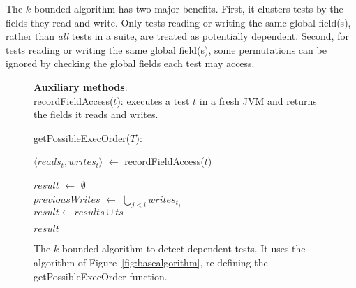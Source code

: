 The \dependenceaware{} $k$-bounded algorithm has two major benefits.
First, it clusters tests by the fields they
read and write. Only tests reading or writing
the same global field(s), rather than \textit{all} tests
in a suite, are treated as potentially dependent.
Second, for tests reading or writing the same global
field(s), some permutations can be ignored by checking
the global fields each test may access. 

\begin{figure}[t]
\textbf{Auxiliary methods}:\\
recordFieldAccess($\mathit{t}$): executes a test $\mathit{t}$ in
a fresh JVM and returns the fields it reads and writes.\\


\vspace{-2mm}

getPossibleExecOrder($T$):\\
\vspace{-5mm}
\begin{algorithmic}[1]
\STATE $\langle \mathit{reads}_t, \mathit{writes}_t\rangle$ $\leftarrow$ recordFieldAccess($\mathit{t}$)\\ 
\ENDFOR

\STATE $\mathit{result}$ $\leftarrow$ $\emptyset$ \\
		\STATE $\mathit{previousWrites}$ $\leftarrow$ $\bigcup_{\mathit{j} < \mathit{i}}  \mathit{writes}_{t_j} $ \\
			\STATE $\mathit{result} \leftarrow \mathit{results} \cup \mathit{ts}$
		\ENDIF
	\ENDFOR

\ENDFOR
\RETURN $\mathit{result}$
\end{algorithmic}

\vspace{-3mm}
\caption {The \dependenceaware{} $k$-bounded algorithm to detect dependent tests.
It uses the algorithm of Figure~\ref{fig:basealgorithm}, re-defining the
getPossibleExecOrder function.
} 
\label{fig:impralg}
\end{figure}



